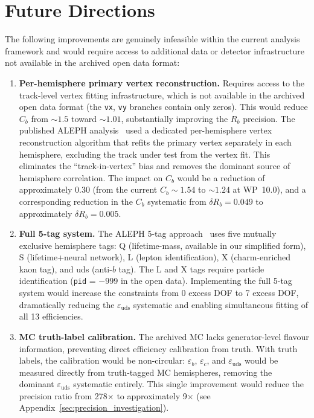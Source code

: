 \documentclass[11pt,a4paper]{article}
\begin{document}
\FloatBarrier
{}
\section{Future Directions}
\label{sec:future}

The following improvements are genuinely infeasible within the current analysis
framework and would require access to additional data or detector infrastructure
not available in the archived open data format:

\begin{enumerate}
\item \textbf{Per-hemisphere primary vertex reconstruction.} Requires access to the
track-level vertex fitting infrastructure, which is not available in the archived
open data format (the \texttt{vx}, \texttt{vy} branches contain only zeros). This
would reduce $C_b$ from $\sim 1.5$ toward $\sim 1.01$, substantially improving the
$R_b$ precision. The published ALEPH analysis~\cite{ALEPH:Rb:1996} used a dedicated
per-hemisphere vertex reconstruction algorithm that refits the primary vertex
separately in each hemisphere, excluding the track under test from the vertex fit.
This eliminates the ``track-in-vertex'' bias and removes the dominant source of
hemisphere correlation. The impact on $C_b$ would be a reduction of approximately
0.30 (from the current $C_b \sim 1.54$ to $\sim 1.24$ at WP~10.0), and a corresponding
reduction in the $C_b$ systematic from $\delta R_b = 0.049$ to approximately
$\delta R_b = 0.005$.

\item \textbf{Full 5-tag system.} The ALEPH 5-tag approach~\cite{ALEPH:Rb:1996}
uses five mutually exclusive hemisphere tags: Q (lifetime-mass, available in our
simplified form), S (lifetime+neural network), L (lepton identification), X
(charm-enriched kaon tag), and uds (anti-$b$ tag). The L and X tags require
particle identification (\texttt{pid} = $-999$ in the open data). Implementing the
full 5-tag system would increase the constraints from 0 excess DOF to 7 excess DOF,
dramatically reducing the $\varepsilon_\mathrm{uds}$ systematic and enabling
simultaneous fitting of all 13 efficiencies.

\item \textbf{MC truth-label calibration.} The archived MC lacks generator-level
flavour information, preventing direct efficiency calibration from truth. With truth
labels, the calibration would be non-circular: $\varepsilon_b$, $\varepsilon_c$, and
$\varepsilon_\mathrm{uds}$ would be measured directly from truth-tagged MC
hemispheres, removing the dominant $\varepsilon_\mathrm{uds}$ systematic entirely.
This single improvement would reduce the precision ratio from 278$\times$ to
approximately 9$\times$ (see Appendix~\ref{sec:precision_investigation}).


\end{enumerate}
\end{document}
